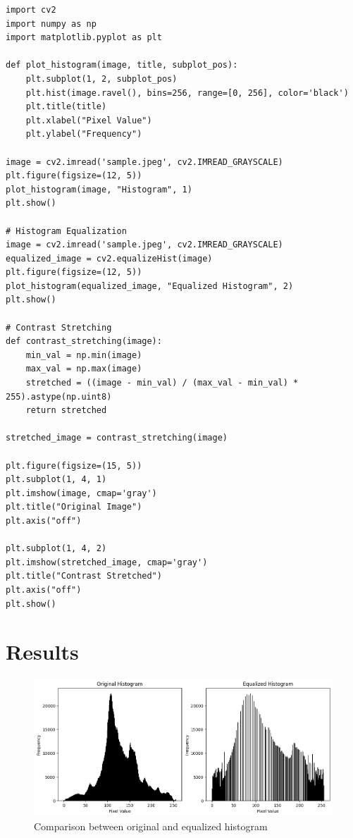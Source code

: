 \documentclass{report}
\begin{document}
\begin{lstlisting}
import cv2
import numpy as np
import matplotlib.pyplot as plt

def plot_histogram(image, title, subplot_pos):
    plt.subplot(1, 2, subplot_pos)
    plt.hist(image.ravel(), bins=256, range=[0, 256], color='black')
    plt.title(title)
    plt.xlabel("Pixel Value")
    plt.ylabel("Frequency")

image = cv2.imread('sample.jpeg', cv2.IMREAD_GRAYSCALE)
plt.figure(figsize=(12, 5))
plot_histogram(image, "Histogram", 1)
plt.show()

# Histogram Equalization
image = cv2.imread('sample.jpeg', cv2.IMREAD_GRAYSCALE)
equalized_image = cv2.equalizeHist(image)
plt.figure(figsize=(12, 5))
plot_histogram(equalized_image, "Equalized Histogram", 2)
plt.show()

# Contrast Stretching
def contrast_stretching(image):
    min_val = np.min(image)
    max_val = np.max(image)
    stretched = ((image - min_val) / (max_val - min_val) * 255).astype(np.uint8)
    return stretched

stretched_image = contrast_stretching(image)

plt.figure(figsize=(15, 5))
plt.subplot(1, 4, 1)
plt.imshow(image, cmap='gray')
plt.title("Original Image")
plt.axis("off")

plt.subplot(1, 4, 2)
plt.imshow(stretched_image, cmap='gray')
plt.title("Contrast Stretched")
plt.axis("off")
plt.show()
\end{lstlisting}

\section{Results}

\begin{figure}[h!]
    \centering
    \includegraphics[width=\textwidth]{images/Exp-6-Results-4.png}
    \caption{Comparison between original and equalized histogram}
    \label{fig:noisy}
\end{figure}
\end{document}
